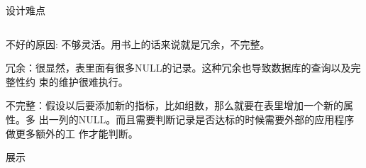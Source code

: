 \documentclass{beamer}
\begin{document}
\begin{frame}{设计难点}
{\begin{tabular}{|l|l|l|l|l|l|l|}
    \end{tabular}


  }

   {
    不好的原因: 不够灵活。用书上的话来说就是冗余，不完整。

    \vspace{3em}

    冗余：很显然，表里面有很多NULL的记录。这种冗余也导致数据库的查询以及完整性约
    束的维护很难执行。

    \vspace{3em}

    不完整：假设以后要添加新的指标，比如组数，那么就要在表里增加一个新的属性。多
    出一列的NULL。而且需要判断记录是否达标的时候需要外部的应用程序做更多额外的工
    作才能判断。
    
  }
  
    
\end{frame}
  
\begin{frame}{展示}

\end{frame}
\end{document}
